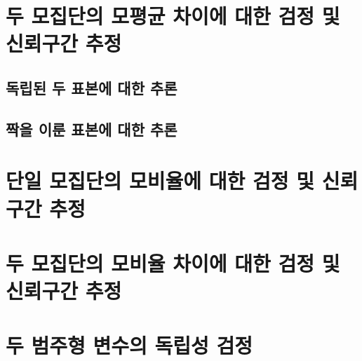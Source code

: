 \documentclass[
]{book}
\begin{document}
\hypertarget{uxb450-uxbaa8uxc9d1uxb2e8uxc758-uxbaa8uxd3c9uxade0-uxcc28uxc774uxc5d0-uxb300uxd55c-uxac80uxc815-uxbc0f-uxc2e0uxb8b0uxad6cuxac04-uxcd94uxc815}{%
\section{두 모집단의 모평균 차이에 대한 검정 및 신뢰구간 추정}\label{uxb450-uxbaa8uxc9d1uxb2e8uxc758-uxbaa8uxd3c9uxade0-uxcc28uxc774uxc5d0-uxb300uxd55c-uxac80uxc815-uxbc0f-uxc2e0uxb8b0uxad6cuxac04-uxcd94uxc815}}

\hypertarget{uxb3c5uxb9bduxb41c-uxb450-uxd45cuxbcf8uxc5d0-uxb300uxd55c-uxcd94uxb860}{%
\subsection{독립된 두 표본에 대한 추론}\label{uxb3c5uxb9bduxb41c-uxb450-uxd45cuxbcf8uxc5d0-uxb300uxd55c-uxcd94uxb860}}

\hypertarget{uxc9dduxc744-uxc774uxb8ec-uxd45cuxbcf8uxc5d0-uxb300uxd55c-uxcd94uxb860}{%
\subsection{짝을 이룬 표본에 대한 추론}\label{uxc9dduxc744-uxc774uxb8ec-uxd45cuxbcf8uxc5d0-uxb300uxd55c-uxcd94uxb860}}

\hypertarget{uxb2e8uxc77c-uxbaa8uxc9d1uxb2e8uxc758-uxbaa8uxbe44uxc728uxc5d0-uxb300uxd55c-uxac80uxc815-uxbc0f-uxc2e0uxb8b0uxad6cuxac04-uxcd94uxc815}{%
\section{단일 모집단의 모비율에 대한 검정 및 신뢰구간 추정}\label{uxb2e8uxc77c-uxbaa8uxc9d1uxb2e8uxc758-uxbaa8uxbe44uxc728uxc5d0-uxb300uxd55c-uxac80uxc815-uxbc0f-uxc2e0uxb8b0uxad6cuxac04-uxcd94uxc815}}

\hypertarget{uxb450-uxbaa8uxc9d1uxb2e8uxc758-uxbaa8uxbe44uxc728-uxcc28uxc774uxc5d0-uxb300uxd55c-uxac80uxc815-uxbc0f-uxc2e0uxb8b0uxad6cuxac04-uxcd94uxc815}{%
\section{두 모집단의 모비율 차이에 대한 검정 및 신뢰구간 추정}\label{uxb450-uxbaa8uxc9d1uxb2e8uxc758-uxbaa8uxbe44uxc728-uxcc28uxc774uxc5d0-uxb300uxd55c-uxac80uxc815-uxbc0f-uxc2e0uxb8b0uxad6cuxac04-uxcd94uxc815}}

\hypertarget{uxb450-uxbc94uxc8fcuxd615-uxbcc0uxc218uxc758-uxb3c5uxb9bduxc131-uxac80uxc815}{%
\section{두 범주형 변수의 독립성 검정}\label{uxb450-uxbc94uxc8fcuxd615-uxbcc0uxc218uxc758-uxb3c5uxb9bduxc131-uxac80uxc815}}
\end{document}

